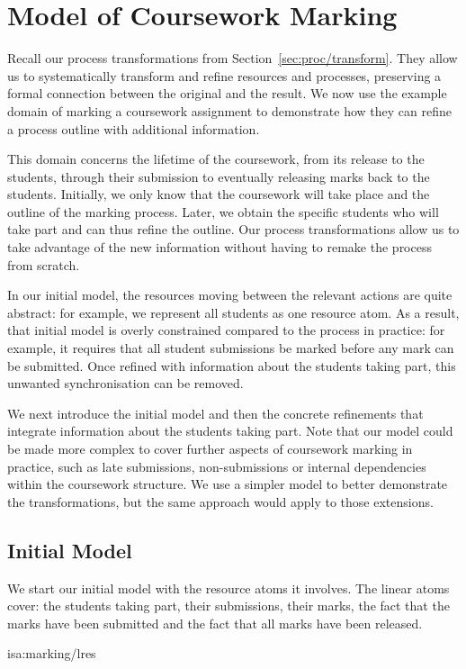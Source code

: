 \documentclass[class=smolathesis,crop=false]{standalone}
\begin{document}
\section{Model of Coursework Marking}
\label{sec:cases/marking}

Recall our process transformations from Section~\ref{sec:proc/transform}.
They allow us to systematically transform and refine resources and processes, preserving a formal connection between the original and the result.
We now use the example domain of marking a coursework assignment to demonstrate how they can refine a process outline with additional information.

This domain concerns the lifetime of the coursework, from its release to the students, through their submission to eventually releasing marks back to the students.
Initially, we only know that the coursework will take place and the outline of the marking process.
Later, we obtain the specific students who will take part and can thus refine the outline.
Our process transformations allow us to take advantage of the new information without having to remake the process from scratch.

In our initial model, the resources moving between the relevant actions are quite abstract: for example, we represent all students as one resource atom.
As a result, that initial model is overly constrained compared to the process in practice: for example, it requires that all student submissions be marked before any mark can be submitted.
Once refined with information about the students taking part, this unwanted synchronisation can be removed.

We next introduce the initial model and then the concrete refinements that integrate information about the students taking part.
Note that our model could be made more complex to cover further aspects of coursework marking in practice, such as late submissions, non-submissions or internal dependencies within the coursework structure.
We use a simpler model to better demonstrate the transformations, but the same approach would apply to those extensions.

\subsection{Initial Model}
\label{sec:cases/marking/init}

We start our initial model with the resource atoms it involves.
The linear atoms cover: the students taking part, their submissions, their marks, the fact that the marks have been submitted and the fact that all marks have been released.
\begin{isadef}{isa:marking/lres}
  
\end{isadef}
\end{document}
